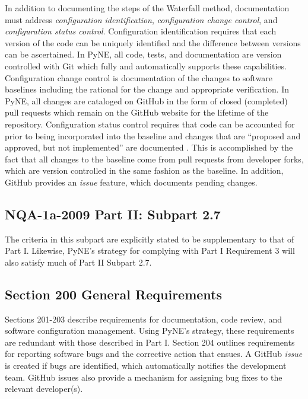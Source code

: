 \documentclass{anstrans}
\begin{document}
In addition to documenting the steps of the Waterfall method,
documentation must address \emph{configuration identification}, \emph{configuration change
control}, and \emph{configuration status control}. Configuration identification
requires that each version of the code can be uniquely identified and the
difference between versions can be ascertained. In PyNE, all code, tests, and
documentation are version controlled with Git which fully and automatically 
supports these
capabilities. Configuration change control is documentation of the changes to
software baselines including the rational for the change and appropriate
verification. In PyNE, all changes are cataloged on GitHub in the form of closed (completed) pull
requests which remain on the GitHub website for the lifetime of the repository.
Configuration status control requires that code can be accounted for prior to
being incorporated into the baseline and changes that are ``proposed and approved,
but not implemented'' are documented \cite{add}. This is accomplished by the fact that all
changes to the baseline come from pull requests from developer forks, which are
version controlled in the same fashion as the baseline. In addition, GitHub
provides an \emph{issue} feature, which documents pending changes.


\subsection{NQA-1a-2009 Part II: Subpart 2.7}

The criteria in this subpart are explicitly stated to be supplementary to that
of Part I. Likewise, PyNE's strategy for complying with Part I Requirement 3 will also satisfy much of Part II Subpart 2.7.

\subsection{Section 200 General Requirements}

Sections 201-203 describe requirements for documentation, code review, and
software configuration management. Using PyNE's strategy, these requirements are redundant with those described in Part I.
Section 204 outlines requirements for reporting software bugs and the corrective
action that ensues. A GitHub \emph{issue} is created if bugs are identified, which
automatically notifies the development team. GitHub
issues also provide a mechanism for assigning bug fixes to the relevant
developer(s). 
\end{document}
